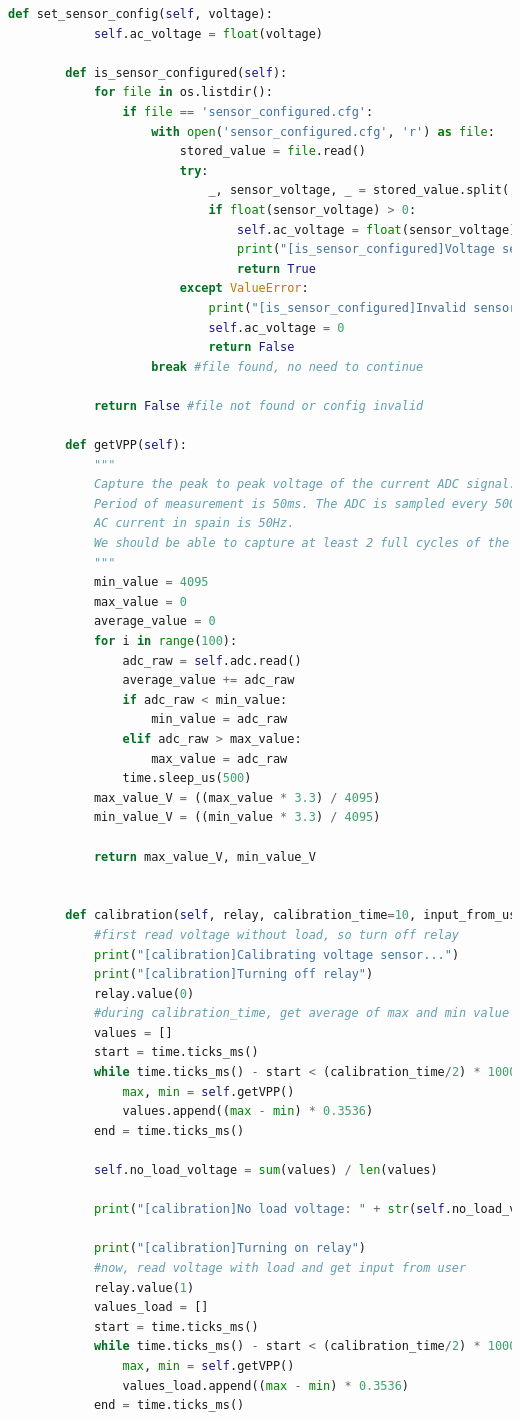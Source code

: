\begin{titlepage}
\begin{lstlisting}[language=python]
		def set_sensor_config(self, voltage):
			self.ac_voltage = float(voltage)
	
		def is_sensor_configured(self):
			for file in os.listdir():
				if file == 'sensor_configured.cfg':
					with open('sensor_configured.cfg', 'r') as file:
						stored_value = file.read()
						try: 
							_, sensor_voltage, _ = stored_value.split(',')
							if float(sensor_voltage) > 0:
								self.ac_voltage = float(sensor_voltage)
								print("[is_sensor_configured]Voltage sensor max voltage set to ", self.load_voltage)
								return True
						except ValueError:
							print("[is_sensor_configured]Invalid sensor config stored in flash")
							self.ac_voltage = 0
							return False
					break #file found, no need to continue
	
			return False #file not found or config invalid
	
		def getVPP(self):
			"""
			Capture the peak to peak voltage of the current ADC signal.
			Period of measurement is 50ms. The ADC is sampled every 500us. 100 samples are taken.
			AC current in spain is 50Hz.
			We should be able to capture at least 2 full cycles of the sinusoidal signal with its peaks.
			"""
			min_value = 4095
			max_value = 0
			average_value = 0
			for i in range(100):
				adc_raw = self.adc.read()
				average_value += adc_raw
				if adc_raw < min_value:
					min_value = adc_raw
				elif adc_raw > max_value:
					max_value = adc_raw
				time.sleep_us(500)
			max_value_V = ((max_value * 3.3) / 4095)
			min_value_V = ((min_value * 3.3) / 4095)
	
			return max_value_V, min_value_V
	
	
		def calibration(self, relay, calibration_time=10, input_from_user=False):
			#first read voltage without load, so turn off relay
			print("[calibration]Calibrating voltage sensor...")
			print("[calibration]Turning off relay")
			relay.value(0)
			#during calibration_time, get average of max and min value from adc
			values = []
			start = time.ticks_ms()
			while time.ticks_ms() - start < (calibration_time/2) * 1000:
				max, min = self.getVPP()
				values.append((max - min) * 0.3536)
			end = time.ticks_ms()
			
			self.no_load_voltage = sum(values) / len(values)
	
			print("[calibration]No load voltage: " + str(self.no_load_voltage) + "V in " + str(end - start) + "ms")
			
			print("[calibration]Turning on relay")
			#now, read voltage with load and get input from user
			relay.value(1)
			values_load = []
			start = time.ticks_ms()
			while time.ticks_ms() - start < (calibration_time/2) * 1000:
				max, min = self.getVPP()
				values_load.append((max - min) * 0.3536)
			end = time.ticks_ms()
			

\end{lstlisting}
\end{titlepage}
